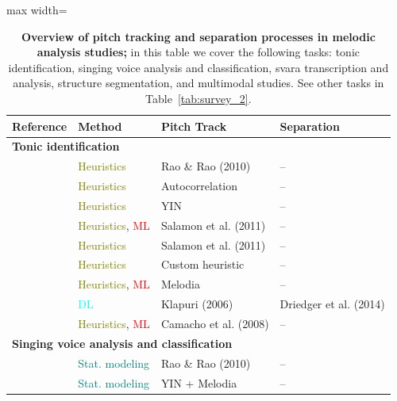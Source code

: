 \begin{table}[p]
\centering
\footnotesize
\caption{\textbf{Overview of pitch tracking and separation processes in melodic analysis studies;} in this table we cover the following tasks: tonic identification, singing voice analysis and classification, svara transcription and analysis, structure segmentation, and multimodal studies. See other tasks in Table~\ref{tab:survey_2}.}
\label{tab:survey_1}
\begin{adjustbox}{max width=\textwidth}
\begin{tabular}{l p{2.2cm} p{3.8cm} p{3.1cm}}
\toprule
\textbf{Reference} & \textbf{Method} & \textbf{Pitch Track} & \textbf{Separation} \\
\midrule
\midrule
\multicolumn{4}{l}{\textbf{Tonic identification}} \\
\midrule
\citep{sengupta-tonic} & \textcolor{olive}{Heuristics} & Rao \& Rao (2010) & -- \\
\citep{ranjani-tonic} & \textcolor{olive}{Heuristics} & Autocorrelation & -- \\
\citep{bellur-tonic} & \textcolor{olive}{Heuristics} & YIN & -- \\
\citep{gulati-tonic_old} & \textcolor{olive}{Heuristics}, \textcolor{red}{ML}  & Salamon et al. (2011) & -- \\
\citep{salamon-tonic} & \textcolor{olive}{Heuristics} & Salamon et al. (2011) & -- \\
\citep{bellur-tonic_cepstrum} & \textcolor{olive}{Heuristics} & Custom heuristic & -- \\
\citep{gulati-tonic} & \textcolor{olive}{Heuristics}, \textcolor{red}{ML} & Melodia & -- \\
\citep{singh-tonic} & \textcolor{cyan}{DL} & Klapuri (2006) & Driedger et al. (2014) \\
\citep{aiswarya-tonic} & \textcolor{olive}{Heuristics}, \textcolor{red}{ML} & Camacho et al. (2008) & -- \\
\midrule
\multicolumn{4}{l}{\textbf{Singing voice analysis and classification}} \\
\midrule
\citep{vidwans-classification} & \textcolor{teal}{Stat. modeling} & Rao \& Rao (2010) & -- \\
\citep{koduri-characterization} & \textcolor{teal}{Stat. modeling} & YIN + Melodia & -- \\

\end{tabular}
\end{adjustbox}
\end{table}

